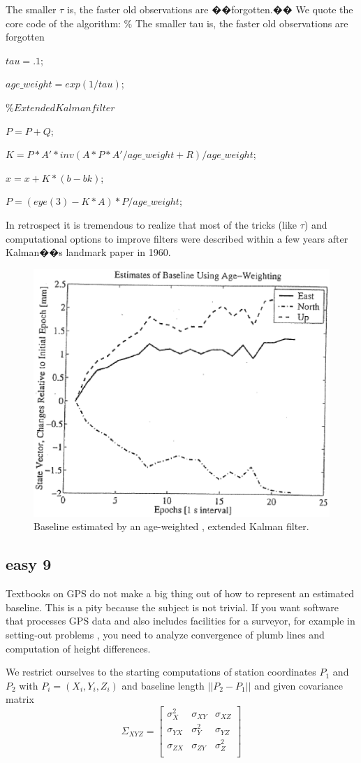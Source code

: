 The smaller $\tau$ is, the faster old observations are ��forgotten.�� We quote the core code of the algorithm:
\% The smaller tau is, the faster old observations are forgotten

$tau = .1$;

$age\_weight = exp(1/tau)$;

$\% Extended Kalman filter$

$P = P + Q$;

$K = P * A' * inv(A * P * A'/age\_weight + R)/age\_weight$;

$x = x + K * (b - bk)$;

$P = (eye(3) - K*A)*P/age\_weight$;

In retrospect it is tremendous to realize that most of the tricks (like $\tau$) and computational options to improve filters were described within a few years after Kalman��s landmark paper in 1960.

\begin{figure}
	\centering
	\includegraphics[width=0.4\linewidth]{TeX_files/Part03/chapter10/image/9-9}
	\caption{Baseline estimated by an age-weighted , extended Kalman filter.}
	\label{fig:9-9}
\end{figure}

\subsection{easy 9}

Textbooks on GPS do not make a big thing out of how to represent an estimated baseline. This is a pity because the subject is not trivial. If you want software that processes GPS data and also includes facilities for a surveyor, for example in setting-out problems , you need to analyze convergence of plumb lines and computation of height differences.

We restrict ourselves to the starting computations of station coordinates $P_{1}$ and $P_{2}$ with $P_{i}=(X_{i},Y_{i},Z_{i})$ and baseline length $||P_{2}-P_{1}||$ and given covariance matrix
$$
\Sigma_{XYZ}=
\begin{bmatrix}
\sigma_{X}^{2}&\sigma_{XY}&\sigma_{XZ}\\
\sigma_{YX}&\sigma_{Y}^{2}&\sigma_{YZ}\\
\sigma_{ZX}&\sigma_{ZY}&\sigma_{Z}^{2}\\
\end{bmatrix}
$$

